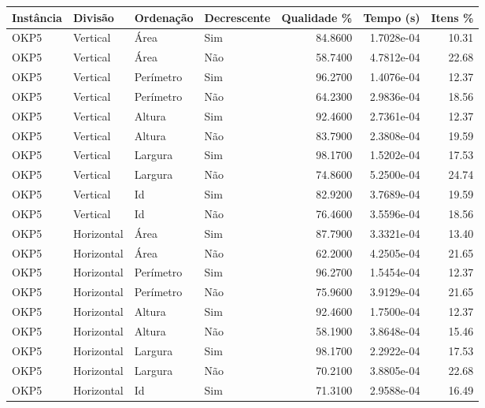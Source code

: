 \begin{tabular}{llllrrr}
\hline
Instância & Divisão     & Ordenação & Decrescente & Qualidade \% & Tempo (s)  & Itens \% \\
\hline
OKP5      & Vertical    & Área      & Sim         & 84.8600      & 1.7028e-04 & 10.31    \\
OKP5      & Vertical    & Área      & Não         & 58.7400      & 4.7812e-04 & 22.68    \\
OKP5      & Vertical    & Perímetro & Sim         & 96.2700      & 1.4076e-04 & 12.37    \\
OKP5      & Vertical    & Perímetro & Não         & 64.2300      & 2.9836e-04 & 18.56    \\
OKP5      & Vertical    & Altura    & Sim         & 92.4600      & 2.7361e-04 & 12.37    \\
OKP5      & Vertical    & Altura    & Não         & 83.7900      & 2.3808e-04 & 19.59    \\
OKP5      & Vertical    & Largura   & Sim         & 98.1700      & 1.5202e-04 & 17.53    \\
OKP5      & Vertical    & Largura   & Não         & 74.8600      & 5.2500e-04 & 24.74    \\
OKP5      & Vertical    & Id        & Sim         & 82.9200      & 3.7689e-04 & 19.59    \\
OKP5      & Vertical    & Id        & Não         & 76.4600      & 3.5596e-04 & 18.56    \\
OKP5      & Horizontal  & Área      & Sim         & 87.7900      & 3.3321e-04 & 13.40    \\
OKP5      & Horizontal  & Área      & Não         & 62.2000      & 4.2505e-04 & 21.65    \\
OKP5      & Horizontal  & Perímetro & Sim         & 96.2700      & 1.5454e-04 & 12.37    \\
OKP5      & Horizontal  & Perímetro & Não         & 75.9600      & 3.9129e-04 & 21.65    \\
OKP5      & Horizontal  & Altura    & Sim         & 92.4600      & 1.7500e-04 & 12.37    \\
OKP5      & Horizontal  & Altura    & Não         & 58.1900      & 3.8648e-04 & 15.46    \\
OKP5      & Horizontal  & Largura   & Sim         & 98.1700      & 2.2922e-04 & 17.53    \\
OKP5      & Horizontal  & Largura   & Não         & 70.2100      & 3.8805e-04 & 22.68    \\
OKP5      & Horizontal  & Id        & Sim         & 71.3100      & 2.9588e-04 & 16.49    \\

\end{tabular}

